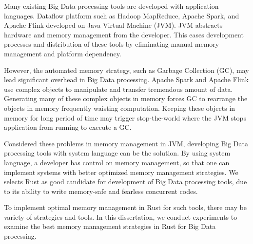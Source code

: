 
Many existing Big Data processing tools are developed with application languages. 
Dataflow platform such as Hadoop MapReduce,  Apache Spark, and Apache Flink 
developed on Java Virtual Machine (JVM). JVM abstracts hardware and memory management from the developer. 
This eases development processes and distribution of these tools by eliminating manual memory management and 
platform dependency. 

However, the automated memory strategy, such as Garbage Collection (GC), may lead significant overhead in Big Data processing. 
Apache Spark and Apache Flink use complex objects to manipulate and transfer tremendous amount of data. 
Generating many of these complex objects in memory forces GC to rearrange the objects in memory frequently waisting computation. 
Keeping these objects in memory for long period of time may trigger stop-the-world where the JVM stops application from running to
execute a GC. 

Considered these problems in memory management in JVM, developing Big Data processing tools with system language can be the solution.
By using system language, a developer has control on memory management, so that one can implement systems with better optimized memory management strategies.
We selects Rust as good candidate for development of Big Data processing tools, due to its ability to write memory-safe and fearless concurrent codes.

To implement optimal memory management in Rust for such tools, there may be variety of strategies and tools. 
In this dissertation, we conduct experiments to examine the best memory management strategies in Rust for Big Data processing. 





